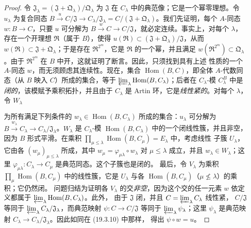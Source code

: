 \begin{proof}
令 $\mathfrak J_\lambda=(\mathfrak J+\mathfrak Q_\lambda)/\mathfrak Q_\lambda$
为 $\mathfrak J$ 在 $C_\lambda$ 中的典范像；它是一个幂零理想。令
$u_\lambda$ 为复合同态
$B\xrightarrow{u}C/\mathfrak J\to C_\lambda/\mathfrak J_\lambda
=C/(\mathfrak J+\mathfrak Q_\lambda)$。我们先证明，每个 $A$-同态
$w:B\to C$，只要 $u$ 可分解为
$B\xrightarrow{w}C\to C/\mathfrak J$，就必定连续。事实上，对每个
$\lambda$，存在一个开理想 $\mathfrak R$（属于 $B$），使得
$u(\mathfrak R)\subset (\mathfrak J+\mathfrak Q_\lambda)/\mathfrak J$，从而
$w(\mathfrak R)\subset\mathfrak J+\mathfrak Q_\lambda$；于是存在
$\mathfrak R^{2^m}$，它是 $\mathfrak R$ 的一个幂，并且满足
$w(\mathfrak R^{2^m})\subset\mathfrak Q_\lambda$。由于
$\mathfrak R^{2^m}$ 在 $B$ 中开，这就证明了断言。因此，只须找到具有上述
性质的一个 $A$-同态 $w$，而无须顾虑其连续性。现在，集合
$\operatorname{Hom}(B,C)$，即全体 $A$-代数同态（从 $B$ 映入 $C$）所成的集合，等于
$\varprojlim_\lambda\operatorname{Hom}(B,C_\lambda)$；后者在
$C_\lambda$-模 $C_\lambda^B$ 中是\emph{闭的}，该模赋予乘积拓扑，并且由于
$C_\lambda$ 是 Artin 环，它是\emph{线性紧的}。对每个 $\lambda$，令
$W_\lambda$


为所有满足下列条件的
$w_\lambda\in\operatorname{Hom}(B,C_\lambda)$ 所成的集合：$u_\lambda$ 可分解为
$B\xrightarrow{w_\lambda}C_\lambda\to
C_\lambda/\mathfrak J_\lambda$。$W_\lambda$ 是 $C_\lambda$-模
$\operatorname{Hom}(B,C_\lambda)$ 中的一个闭线性簇，并且非空，因为 $B$
形式平滑。在乘积
$\prod_{\mu\leq\lambda}\operatorname{Hom}(B,C_\mu)=E_\lambda$ 中，考虑线性
子簇 $U_\lambda$，它由各 $(w_\mu)_{\mu\leq\lambda}$ 所成，其中
$w_\mu=\varphi_{\mu\lambda}\circ w_\lambda$ 对 $\mu\leq\lambda$ 成立，并且
$w_\lambda\in W_\lambda$；这里
$\varphi_{\mu\lambda}:C_\lambda\to C_\mu$ 是典范同态。这个子簇也是闭的。
最后，令 $V_\lambda$ 为乘积
$\prod_\mu\operatorname{Hom}(B,C_\mu)$ 中的线性簇，它是 $U_\lambda$ 与各
$\operatorname{Hom}(B,C_\mu)$（$\mu\not\leq\lambda$）的乘积；它仍然闭。
问题归结为证明各 $V_\lambda$ 的交\emph{非空}，因为这个交的任一元素 $w$
依定义都属于 $\varprojlim_\lambda\operatorname{Hom}(B,C_\lambda)$。此外，
由于 $\mathfrak J$ 闭，并且 $C=\varprojlim_\lambda C_\lambda$ 线性紧，
$C/\mathfrak J$ 等同于
$\varprojlim_\lambda C_\lambda/\mathfrak J_\lambda$，而典范映射
$\psi:C\to C/\mathfrak J$ 等同于 $\varprojlim_\lambda\psi_\lambda$；这里
$\psi_\lambda$ 是典范映射
$C_\lambda\to C_\lambda/\mathfrak J_\lambda$。因此如同在 (19.3.10) 中那样，
得出 $\psi\circ w=u$。
\end{proof}

